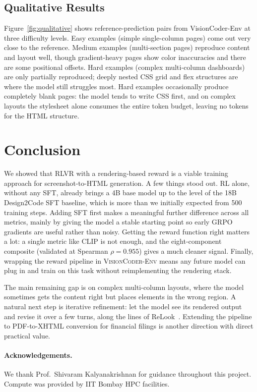 \documentclass[10pt,twocolumn,letterpaper]{article}
\newcommand{\model}[1]{\textsc{#1}}
\begin{document}
\subsection{Qualitative Results}

Figure~\ref{fig:qualitative} shows reference-prediction pairs from
VisionCoder-Env at three difficulty levels.  Easy examples (simple
single-column pages) come out very close to the reference.  Medium examples
(multi-section pages) reproduce content and layout well, though gradient-heavy
pages show color inaccuracies and there are some positional offsets.  Hard examples (complex multi-column dashboards) are only
partially reproduced; deeply nested CSS grid and flex structures are where the
model still struggles most.  Hard examples occasionally produce completely blank
pages: the model tends to write CSS first, and on complex layouts the
stylesheet alone consumes the entire token budget, leaving no tokens for the
HTML structure.

\section{Conclusion}

We showed that RLVR with a rendering-based reward is a viable training
approach for screenshot-to-HTML generation.  A few things stood out.  RL alone,
without any SFT, already brings a 4B base model up to the level of the 18B
Design2Code SFT baseline, which is more than we initially expected from 500
training steps.  Adding SFT first makes a meaningful further difference across
all metrics, mainly by giving the model a stable starting point so early GRPO
gradients are useful rather than noisy.  Getting the reward function right
matters a lot: a single metric like CLIP is not enough, and the eight-component
composite (validated at Spearman $\rho\!=\!0.955$) gives a much cleaner signal.
Finally, wrapping the reward pipeline in \model{VisionCoder-Env} means any
future model can plug in and train on this task without reimplementing the
rendering stack.

The main remaining gap is on complex multi-column layouts, where the model
sometimes gets the content right but places elements in the wrong region.
A natural next step is iterative refinement: let the model see its rendered
output and revise it over a few turns, along the lines of
ReLook~\citep{relook2025}.  Extending the pipeline to PDF-to-XHTML conversion
for financial filings is another direction with direct practical value.

\paragraph{Acknowledgements.}
We thank Prof.\ Shivaram Kalyanakrishnan for guidance throughout this project.
Compute was provided by IIT Bombay HPC facilities.



\end{document}
